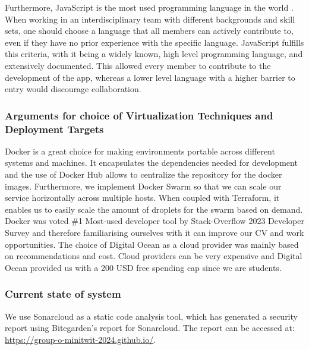 \documentclass[11pt]{article}
\begin{document}
Furthermore, JavaScript is the most used programming language in the world \citep{javascript_good}. When working in an interdisciplinary team with different backgrounds and skill sets, one should choose a language that all members can actively contribute to, even if they have no prior experience with the specific language. JavaScript fulfills this criteria, with it being a widely known, high level programming language, and extensively documented. This allowed every member to contribute to the development of the app, whereas a lower level language with a higher barrier to entry would discourage collaboration. 


\subsubsection{Arguments for choice of Virtualization Techniques and Deployment Targets}
Docker is a great choice for making environments portable across different systems and machines. It encapsulates the dependencies needed for development and the use of Docker Hub allows to centralize the repository for the docker images. Furthermore, we implement Docker Swarm so that we can scale our service horizontally across multiple hosts. When coupled with Terraform, it enables us to easily scale the amount of droplets for the swarm based on demand. Docker was voted \#1 Most-used developer tool by Stack-Overflow 2023 Developer Survey \citep{docker_no1} and therefore familiarising ourselves with it can improve our CV and work opportunities.
The choice of Digital Ocean as a cloud provider was mainly based on recommendations and cost. Cloud providers can be very expensive and Digital Ocean provided us with a 200 USD free spending cap since we are students.

\subsubsection{Current state of system}
We use Sonarcloud as a static code analysis tool, which has generated a security report using Bitegarden's report for Sonarcloud. The report can be accessed at: \url{https://group-o-minitwit-2024.github.io/}. 
\end{document}
